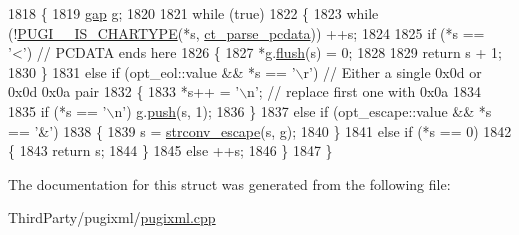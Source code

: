 \begin{DoxyCode}
1818         \{
1819             \hyperlink{structgap}{gap} g;
1820             
1821             \textcolor{keywordflow}{while} (\textcolor{keyword}{true})
1822             \{
1823                 \textcolor{keywordflow}{while} (!\hyperlink{pugixml_8cpp_a2adf5ae9b7505408a18e9f3bb1b3d332}{PUGI\_\_IS\_CHARTYPE}(*s, \hyperlink{pugixml_8cpp_ae83a55e5947d28c62625b690b1484108aa0f09a99c3d76641d00d0ad11f4f2fa1}{ct\_parse\_pcdata})) ++s;
1824                     
1825                 \textcolor{keywordflow}{if} (*s == \textcolor{charliteral}{'<'}) \textcolor{comment}{// PCDATA ends here}
1826                 \{
1827                     *g.\hyperlink{structgap_a176c58ee8d57c41b91ae9f00d5e8cab5}{flush}(s) = 0;
1828                     
1829                     \textcolor{keywordflow}{return} s + 1;
1830                 \}
1831                 \textcolor{keywordflow}{else} \textcolor{keywordflow}{if} (opt\_eol::value && *s == \textcolor{charliteral}{'\(\backslash\)r'}) \textcolor{comment}{// Either a single 0x0d or 0x0d 0x0a pair}
1832                 \{
1833                     *s++ = \textcolor{charliteral}{'\(\backslash\)n'}; \textcolor{comment}{// replace first one with 0x0a}
1834                     
1835                     \textcolor{keywordflow}{if} (*s == \textcolor{charliteral}{'\(\backslash\)n'}) g.\hyperlink{structgap_a9c0d0b12bc778c8439c8aec7747ab2b0}{push}(s, 1);
1836                 \}
1837                 \textcolor{keywordflow}{else} \textcolor{keywordflow}{if} (opt\_escape::value && *s == \textcolor{charliteral}{'&'})
1838                 \{
1839                     s = \hyperlink{pugixml_8cpp_a7cf2b6da7b109a11f8cb1c7e1a09bf7e}{strconv\_escape}(s, g);
1840                 \}
1841                 \textcolor{keywordflow}{else} \textcolor{keywordflow}{if} (*s == 0)
1842                 \{
1843                     \textcolor{keywordflow}{return} s;
1844                 \}
1845                 \textcolor{keywordflow}{else} ++s;
1846             \}
1847         \}
\end{DoxyCode}


The documentation for this struct was generated from the following file\-:\begin{DoxyCompactItemize}
\item 
Third\-Party/pugixml/\hyperlink{pugixml_8cpp}{pugixml.\-cpp}\end{DoxyCompactItemize}
